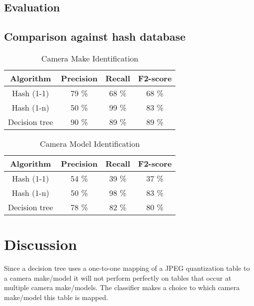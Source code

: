 \subsection{Evaluation}

\subsection{Comparison against hash database}
\begin{table}
\begin{tabular}{| c| c| c| c|}
\hline
Algorithm & Precision & Recall & F2-score\\
\hline
Hash (1-1) & 79 \% & 68 \% & 68 \%\\
Hash (1-n) & 50 \% & 99 \% & 83 \%\\
Decision tree & 90 \% & 89 \% & 89 \% \\
\hline
\end{tabular}
\caption{Camera Make Identification}
\end{table}

\begin{table}

\begin{tabular}{| c| c| c| c|}
\hline
Algorithm & Precision & Recall & F2-score\\
\hline
Hash (1-1) & 54 \% & 39 \% & 37 \%\\
Hash (1-n) & 50 \% & 98 \% & 83 \%\\
Decision tree & 78 \% & 82 \% & 80 \% \\
\hline
\end{tabular}
\caption{Camera Model Identification}

\end{table}

\section{Discussion}

Since a decision tree uses a one-to-one mapping of a JPEG quantization table to a camera make/model it will not perform perfectly on tables that occur at multiple camera make/models. The classifier makes a choice to which camera make/model this table is mapped. 


